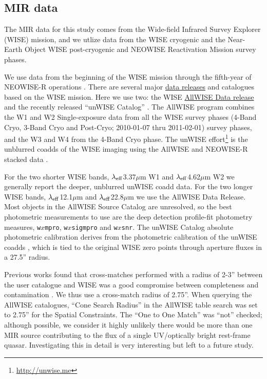 \documentclass[usenatbib]{mnras}
\begin{document}
\subsection{MIR data}
The MIR data for this study comes from the Wide-field Infrared Survey Explorer (WISE) mission, and we utlize data from the WISE cryogenic and the Near-Earth Object WISE \citep[NEOWISE; ][]{Mainzer2011} post-cryogenic and NEOWISE Reactivation Mission \citep[NEOWISE-R][]{Mainzer2014} survey phases.

We use data from the beginning of the WISE mission \citep[2010 January; ][]{Wright2010} through the fifth-year of NEOWISE-R operations \citep[2018 December;]{Mainzer2011}.  There are several  major \href{https://irsa.ipac.caltech.edu/Missions/wise.html}{data releases} and catalogues based on the WISE mission. Here we use two: the WISE \href{http://wise2.ipac.caltech.edu/docs/release/allwise/}{AllWISE Data release} and the recently released ``unWISE Catalog'' \citep{Schlafly2019}. The AllWISE program combines the W1 and W2 Single-exposure data from all the WISE survey phases (4-Band Cryo, 3-Band Cryo and Post-Cryo; 2010-01-07 thru 2011-02-01) survey phases, and the W3 and W4 from the 4-Band Cryo phase. The unWISE effort\footnote{\href{http://unwise.me}{http://unwise.me}} is the unblurred coadds of the WISE imaging using the AllWISE and NEOWISE-R stacked data \citep{Lang2014, Meisner2018a, Meisner2018b}.

For the two shorter WISE bands, $\lambda_{\rm eff}$3.37$\mu$m W1 and $\lambda_{\rm eff}$4.62$\mu$m W2 we generally report the deeper, unblurred unWISE coadd data.  For the two longer WISE bands, $\lambda_{\rm eff}$12.1$\mu$m and $\lambda_{\rm eff}$22.8$\mu$m we use the AllWISE Data Release.  Most objects in the AllWISE Source Catalog are unresolved, so the best photometric measurements to use are the deep detection profile-fit photometry measures,  {\tt w$x$mpro},  {\tt w$x$sigmpro} and  {\tt w$x$snr}. The unWISE Catalog absolute photometric calibration derives from the photometric calibration of the unWISE coadds \citep{Meisner2017a}, which is tied to the original WISE zero points through aperture fluxes in a 27.5'' radius.

Previous works \citep[e.g., ][]{Krawczyk2013, Ross2015, Bilicki2016} found that cross-matches performed with a radius of 2-3'' between the user catalogue and WISE was a good compromise between completeness and contamination \citep[see e.g. Figure 4 of ][]{Krawczyk2013}. We thus use a cross-match radius of 2.75''. When querying the AllWISE catalogues, ``Cone Search Radius'' in the AllWISE table search was set to 2.75'' for the Spatial Constraints. The ``One to One Match'' was ``not'' checked; although possible, we consider it highly unlikely there would be more than one MIR source contributing to the flux of a single UV/optically bright rest-frame quasar. Investigating this in detail is very interesting but left to a future study. 
\end{document}

